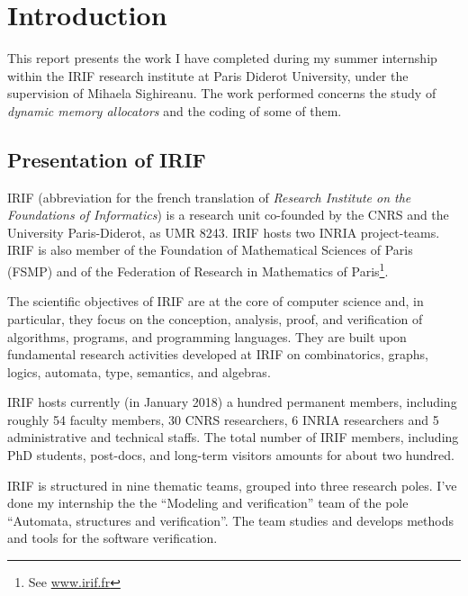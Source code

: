 \section{Introduction}

This report presents the work I have completed during my summer internship within the IRIF research institute at  Paris Diderot University, under the supervision of Mihaela Sighireanu. The work performed concerns the study  of \emph{dynamic memory allocators} and the coding of some of them.


\subsection{Presentation of IRIF}
IRIF (abbreviation for the french translation of \emph{Research Institute on the Foundations of Informatics})
is a research unit co-founded by the CNRS and the University Paris-Diderot, as UMR 8243. IRIF hosts two INRIA project-teams. IRIF is also member of the Foundation of Mathematical Sciences of Paris (FSMP) and of the Federation of Research in Mathematics of Paris\footnote{See \url{www.irif.fr}}. 

The scientific objectives of IRIF are at the core of computer science and, in particular, they focus on the conception, analysis, proof, and verification of algorithms, programs, and programming languages. They are built upon fundamental research activities developed at IRIF on combinatorics, graphs, logics, automata, type, semantics, and algebras.

IRIF hosts currently (in January 2018) a hundred permanent members, including roughly 54 faculty members, 30 CNRS researchers, 6 INRIA researchers and 5 administrative and technical staffs. The total number of IRIF members, including PhD students, post-docs, and long-term visitors amounts for about two hundred. 

IRIF is structured in nine thematic teams, grouped into three research poles.
I've done my internship the the ``Modeling and verification'' team of the pole ``Automata, structures and verification''. The team studies and develops methods and tools for the software verification.


